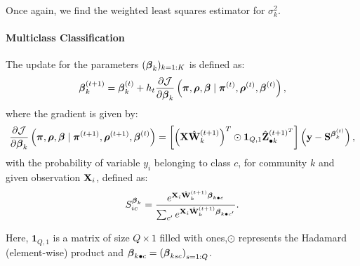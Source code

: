 Once again, we find the weighted least squares estimator for ${\sigma_k^2}$.

\paragraph{Multiclass Classification}
The update for the parameters $(\boldsymbol{\beta}_k)_{k=1:K}$ is defined as:
\begin{equation}
    \boldsymbol{\beta}^{(t+1)}_k =  \boldsymbol{\beta}^{(t)}_k + h_t \frac{\partial \mathcal{J}}{\partial \boldsymbol{\beta}_k}\left(\boldsymbol{\pi}, \boldsymbol{\rho}, \boldsymbol{\beta} \mid \boldsymbol{\pi}^{(t)}, \boldsymbol{\rho}^{(t)}, \boldsymbol{\beta}^{(t)} \right),
\end{equation}
where the gradient is given by:
\begin{equation}
    \frac{\partial \mathcal{J}}{\partial \boldsymbol{\beta}_k} \left(\boldsymbol{\pi}, \boldsymbol{\rho}, \boldsymbol{\beta} \mid \boldsymbol{\pi}^{(t+1)}, \boldsymbol{\rho}^{(t+1)}, \boldsymbol{\beta}^{(t)} \right) = \left[\left( \mathbf{X} \hat{\mathbf{W}}^{(t+1)}_{k }\right)^T \odot \mathbf{1}_{Q,1} \hat{\mathbf{Z}}_{\bullet k}^{(t+1)^T} \right] \left( \mathbf{y} - \mathbf{S}^{\boldsymbol{\beta}_k^{(t)}} \right),
    \label{eq: MoEBIUS_beta_classif}
\end{equation}
with the probability of variable $y_i$ belonging to class $c$, for community $k$ and given observation $\mathbf{X}_i$, defined as:
\begin{equation}
    S^{\boldsymbol{\beta}_k}_{ic} = \dfrac{e^{\mathbf{X}_i \hat{\mathbf{W}}^{(t+1)}_{k } \boldsymbol{\beta}_{k\bullet c}}}{\sum_{c'} e^{\mathbf{X}_i \hat{\mathbf{W}}^{(t+1)}_{k } \boldsymbol{\beta}_{k\bullet c'}} }.
\end{equation}

Here, $\mathbf{1}_{Q,1}$ is a matrix of size $Q \times 1$ filled with ones,$\odot$ represents the Hadamard (element-wise) product and $\boldsymbol{\beta}_{k\bullet c} = \left( \boldsymbol{\beta}_{ksc}\right)_{s=1:Q}$.

